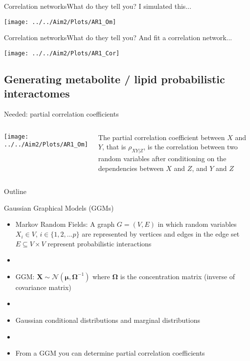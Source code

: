 \documentclass[xcolor=dvipsnames]{beamer}
\begin{document}
\begin{frame}{Correlation networks}{What do they tell you?}
	{I simulated this...}
	\begin{center}
		\texttt{[image: ../../Aim2/Plots/AR1\_Om]}
	\end{center}
\end{frame}

\begin{frame}{Correlation networks}{What do they tell you?}
	{And fit a correlation network...}
	\begin{center}
		\texttt{[image: ../../Aim2/Plots/AR1\_Cor]}
	\end{center}
\end{frame}

\subsection{Generating metabolite / lipid probabilistic interactomes}

\begin{frame}{Needed: partial correlation coefficients}
\begin{columns}
	\vspace{-15 pt}
	\begin{center}
		\texttt{[image: ../../Aim2/Plots/AR1\_Om]}
	\end{center}
 The partial correlation coefficient between $X$ and $Y$, that is $\rho_{XY|Z}$, is the correlation between two random variables after conditioning on the dependencies between $X$ and $Z$, and $Y$ and $Z$ 
\end{columns}
\end{frame}

\begin{frame}{Outline}
\vspace{-10.5pt}
\tableofcontents[currentsection,subsectionstyle=show/shaded/hide]
\addtocounter{framenumber}{-1}
\end{frame}

\begin{frame}{Gaussian Graphical Models (GGMs)}
	\vspace{-5.5pt}
	\begin{itemize}
		\item Markov Random Fields: A graph $G=(V,E)$ in which random variables $X_i\in V$, $i\in \{1,2,...p\}$ are represented by vertices and edges in the edge set $E \subseteq V \times V$ represent probabilistic interactions \pause
		\item[]
		\item GGM: $\textbf{X}\sim \mathcal{N}(\boldsymbol{\mu},\boldsymbol{\Omega}^{-1})$ where $\boldsymbol{\Omega}$ is the concentration matrix (inverse of covariance matrix) \pause
		\item[]
		\item Gaussian conditional distributions and marginal distributions \pause
		\item[]
		\item From a GGM you can determine partial correlation coefficients 
	\end{itemize}
\end{frame}
\end{document}
